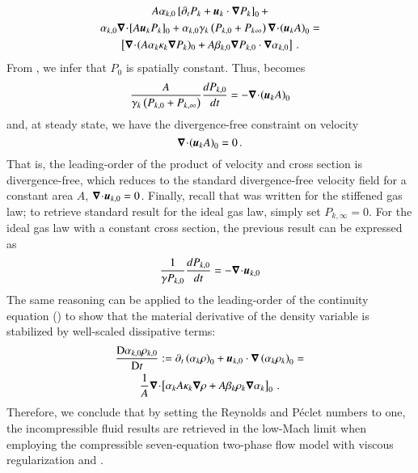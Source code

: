 \documentclass[preprint,10pt]{elsarticle}
\begin{document}
{\begin{multline}\label{eq:asympt_equ3_ener}
A \alpha_{k,0} \left[ \partial_t  P_k  + \boldsymbol u_k \cdot \boldsymbol\nabla  P_k \right]_0 + \\  \alpha_{k,0} \boldsymbol\nabla\! \cdot \! \left[ A \boldsymbol u_k P_k \right]_0 +
\alpha_{k,0} \gamma_k \left( P_{k,0} +  P_{k\infty} \right) \boldsymbol\nabla\! \cdot \! \left( \boldsymbol u_k A\right)_0 = \\
\left[ \boldsymbol\nabla\! \cdot \!(A \alpha_k \kappa_k \boldsymbol\nabla P_k)_0 + A \beta_{k,0} \boldsymbol\nabla P_{k,0} \cdot \boldsymbol\nabla \alpha_{k,0} \right]  \,.
\end{multline}
%
From , we infer that $P_0$ is spatially constant. Thus,  becomes
%
\begin{equation}\label{eq:div_free_energy}
\frac{ A}{\gamma_k\left( P_{k,0} + P_{k,\infty} \right)} \frac{d P_{k,0}}{dt} = - \boldsymbol\nabla\! \cdot \! \left( \boldsymbol u_k A \right)_0 
\end{equation}
%
and, at steady state, we have the divergence-free constraint on velocity
%
\begin{equation}
\boldsymbol\nabla\! \cdot \! \left( \boldsymbol u_k A \right)_0  = 0 \, .
\end{equation}
%
That is, the leading-order of the product of velocity and cross section is divergence-free, which reduces to the standard divergence-free velocity field for a constant area $A$, $\boldsymbol\nabla\! \cdot \! \boldsymbol u_{k,0}=0$. Finally, recall that  was written for the stiffened gas law; to retrieve standard result for the ideal gas law, simply set $P_{k,\infty}=0$. For the ideal gas law with a constant cross section, the previous result can be expressed as
%
\begin{equation}
\frac{1}{\gamma P_{k,0}} \frac{d P_{k,0}}{dt} = - \boldsymbol\nabla\! \cdot \!\boldsymbol u_{k,0} 
\end{equation}
%
The same reasoning can be applied to the leading-order 
of the continuity equation () to show that the material derivative of the density variable is stabilized by well-scaled dissipative terms:
\begin{multline}
\frac{\textrm{D} \alpha_{k,0} \rho_{k,0}}{\textrm{D} t} := \partial_t \left( \alpha_k \rho\right)_0 + \boldsymbol u_{k,0} \cdot \boldsymbol\nabla \left( \alpha_k \rho_k \right)_0 =\\
\frac{1}{A}  \boldsymbol\nabla\! \cdot \! \left[ \alpha_k A \kappa_k \boldsymbol\nabla \rho + A \beta_k \rho_k \boldsymbol\nabla \alpha_k \right]_0 \, .
\end{multline}
%
Therefore, we conclude that by setting the Reynolds and P\'eclet numbers to one, the incompressible fluid 
results are retrieved in the low-Mach limit when employing the compressible seven-equation two-phase flow model 
with viscous regularization and . \\

}
\end{document}
